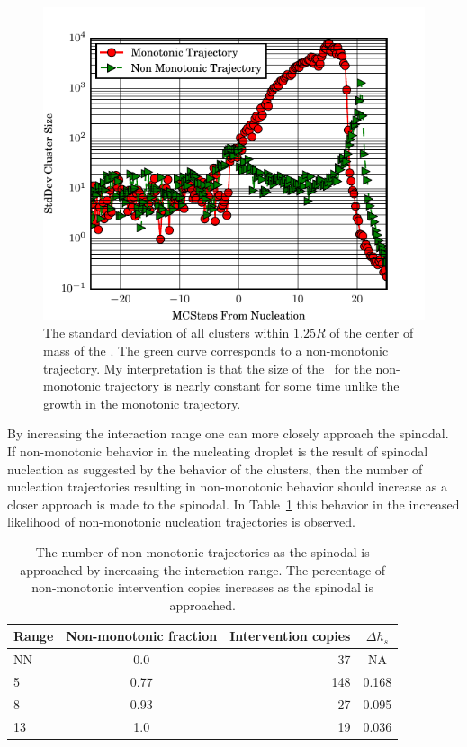 \begin{figure}[!h]
    \centering
      \includegraphics[scale=1.1]{Figures/intervention_ising/stdCluster--inbox-.pdf}
    \caption{ The standard deviation of all clusters within $1.25 R$ of the center of mass of the \nd. The green curve corresponds to a non-monotonic trajectory. My interpretation is that the size of the \nd\ for the non-monotonic trajectory is nearly constant for some time unlike the growth in the monotonic trajectory.}
  \label{fig:stdclusterR}
\end{figure}%
By increasing the interaction range one can  more closely approach the spinodal. If non-monotonic behavior in the nucleating droplet is the result of spinodal nucleation as suggested by the behavior of the clusters, then the number of nucleation trajectories resulting in non-monotonic behavior should increase as a closer approach is made to the spinodal. In Table~\ref{tbl:spinodalnuc} this behavior in the increased likelihood of non-monotonic nucleation trajectories is observed.  %
\bigskip
\begin{table}[!ht]
\centering
	\begin{tabular}{| l || c | r | c|}
	\hline
Range    & Non-monotonic fraction & Intervention copies & $\Delta h_s$\\
\hline
NN  & 0.0   & 37  & NA      \\
5  & 0.77   & 148 &   0.168 \\
8  & 0.93   & 27 &   0.095 \\
13  & 1.0   & 19  &   0.036 \\ \hline
	\end{tabular}
\caption{The number of non-monotonic trajectories as the spinodal is approached by increasing the interaction range. The percentage  of non-monotonic intervention copies increases as the spinodal is approached.
  	}
\label{tbl:spinodalnuc}
\end{table}%



